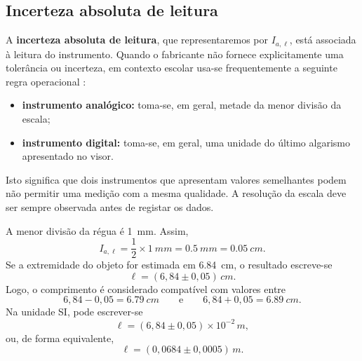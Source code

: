 \documentclass[11pt,a4paper,openany]{book}
\begin{document}
\subsection{Incerteza absoluta de leitura}

A \textbf{incerteza absoluta de leitura}, que representaremos por $I_{a,\ell}$, está associada à leitura do instrumento. Quando o fabricante não fornece explicitamente uma tolerância ou incerteza, em contexto escolar usa-se frequentemente a seguinte regra operacional \cite{DGE10,DGEGTA5}:

\begin{itemize}[leftmargin=1.2cm]
\item \textbf{instrumento analógico:} toma-se, em geral, metade da menor divisão da escala;
\item \textbf{instrumento digital:} toma-se, em geral, uma unidade do último algarismo apresentado no visor.
\end{itemize}

Isto significa que dois instrumentos que apresentam valores semelhantes podem não permitir uma medição com a mesma qualidade. A resolução da escala deve ser sempre observada antes de registar os dados.

\begin{exemploresolvido}
A menor divisão da régua é \SI{1}{mm}. Assim,
\[
I_{a,\ell}=\frac{1}{2}\times\SI{1}{mm}=\SI{0.5}{mm}=\SI{0.05}{cm}.
\]
Se a extremidade do objeto for estimada em \SI{6.84}{cm}, o resultado escreve-se
\[
\boxed{\ell=(6,84\pm0,05)\,\si{cm}}.
\]
Logo, o comprimento é considerado compatível com valores entre
\[
6,84-0,05=\SI{6.79}{cm}
\qquad\text{e}\qquad
6,84+0,05=\SI{6.89}{cm}.
\]
Na unidade SI, pode escrever-se
\[
\ell=(6,84\pm0,05)\times10^{-2}\,\si{m},
\]
ou, de forma equivalente,
\[
\ell=(0,0684\pm0,0005)\,\si{m}.
\]
\end{exemploresolvido}
\end{document}
